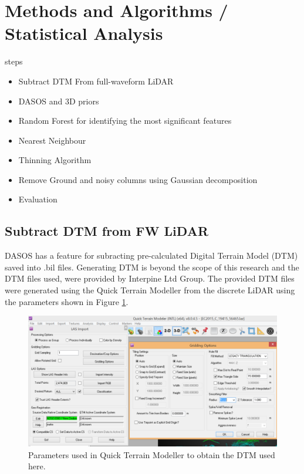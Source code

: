\documentclass{subfiles}
\begin{document}
\section{Methods and Algorithms / Statistical Analysis}

\par steps

\begin{itemize}
	\item Subtract DTM From full-waveform LiDAR
	\item DASOS and 3D priors
	\item Random Forest for identifying the most significant features
	\item Nearest Neighbour 
	\item Thinning Algorithm
	\item Remove Ground and noisy columns using Gaussian decomposition
	\item Evaluation
\end{itemize}

\subsection{Subtract DTM from FW LiDAR}\label{sec:DTMsub}

\par DASOS has a feature for subracting pre-calculated Digital Terrain Model (DTM) saved into .bil files. Generating DTM is beyond the scope of this research and the DTM files used, were provided by Interpine Ltd Group. The provided DTM files were generated using the Quick Terrain Modeller from the discrete LiDAR using the parameters shown in Figure \ref{fig:DTM_parameters}.

\begin{figure} [h!]
	\centering
	\includegraphics[width=\textwidth]{img/dead/DTM_parameters}
	\caption{Parameters used in Quick Terrain Modeller to obtain the DTM used here.}
	\label{fig:DTM_parameters}
\end{figure}
\end{document}
